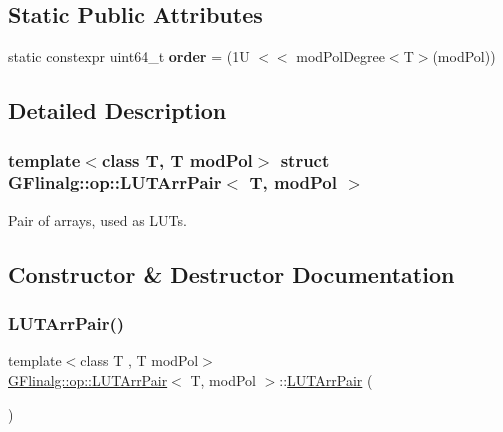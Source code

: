 \subsection*{Static Public Attributes}
\begin{DoxyCompactItemize}
\item 
\mbox{\label{struct_g_flinalg_1_1op_1_1_l_u_t_arr_pair_a7ce023ead2aa0042227df974255f57db}} 
static constexpr uint64\+\_\+t {\bfseries order} = (1\+U $<$$<$ mod\+Pol\+Degree$<$\+T$>$(mod\+Pol))
\end{DoxyCompactItemize}


\subsection{Detailed Description}
\subsubsection*{template$<$class T, T mod\+Pol$>$\newline
struct G\+Flinalg\+::op\+::\+L\+U\+T\+Arr\+Pair$<$ T, mod\+Pol $>$}

Pair of arrays, used as L\+U\+Ts. 

\subsection{Constructor \& Destructor Documentation}
\mbox{\label{struct_g_flinalg_1_1op_1_1_l_u_t_arr_pair_a639ced221b57026c7d9881c86d219ea5}} 
\subsubsection{\texorpdfstring{LUTArrPair()}{LUTArrPair()}}
{\footnotesize\ttfamily template$<$class T , T mod\+Pol$>$ \\
\mbox{\hyperlink{struct_g_flinalg_1_1op_1_1_l_u_t_arr_pair}{G\+Flinalg\+::op\+::\+L\+U\+T\+Arr\+Pair}}$<$ T, mod\+Pol $>$\+::\mbox{\hyperlink{struct_g_flinalg_1_1op_1_1_l_u_t_arr_pair}{L\+U\+T\+Arr\+Pair}} (\begin{DoxyParamCaption}{ }\end{DoxyParamCaption})\hspace{0.3cm}{\ttfamily [inline]}}

